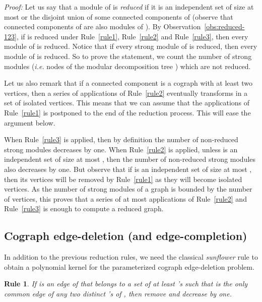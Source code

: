 \documentclass[11pt]{article}
\newenvironment{proof}{\noindent\textit{Proof: }}{{\hfill }}
\newtheorem{reduction}{Rule}
\begin{document}
\begin{proof}
Let us say that a module  of  is \emph{reduced} if it is an independent set of size at most  or the disjoint union of some connected components of  (observe that connected components of  are also modules of ). By Observation~\ref{obs:reduced-123}, if  is reduced under Rule~\ref{rule1}, Rule~\ref{rule2} and Rule~\ref{rule3}, then every module of  is reduced. Notice that if every strong module of  is reduced, then every module of  is reduced.
So to prove the statement, we count the number of strong modules (\textit{i.e.} nodes of the modular decomposition tree ) which are not reduced. 

Let us also remark that if a connected component  is a cograph with at least two vertices, then a series of applications of Rule~\ref{rule2} eventually transforms  in a set of isolated vertices. This means that we can assume that the applications of Rule~\ref{rule1} is postponed to the end of the reduction process. This will ease the argument below.

When Rule~\ref{rule3} is applied, then by definition the number of non-reduced strong modules decreases by one. When Rule~\ref{rule2} is applied, unless  is an independent set of size at most , then the number of non-reduced strong modules also decreases by one. But observe that if  is an independent set of size at most , then its vertices will be removed by Rule~\ref{rule1} as they will become isolated vertices. As the number of strong modules of a graph is bounded by the number of vertices, this proves that a series of at most  applications of Rule~\ref{rule2} and Rule~\ref{rule3} is enough to compute a reduced graph.
\end{proof}

\subsection{Cograph edge-deletion (and edge-completion)}

In addition to the previous reduction rules, we need the classical \emph{sunflower} rule to obtain a polynomial kernel for the parameterized cograph edge-deletion problem.

\begin{reduction} \label{rule:sunflower-del}
If  is an edge of  that belongs to a set  of at least  's such that  is the only common edge of any two distinct 's of , then remove  and decrease  by one.
\end{reduction}
\end{document}
